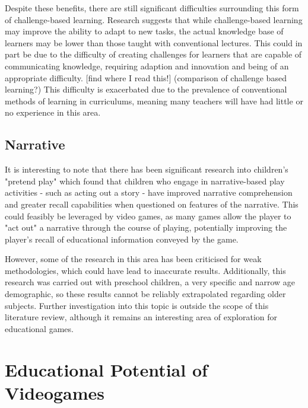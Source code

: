 \documentclass[journal]{IEEEtran}
\begin{document}
Despite these benefits, there are still significant difficulties surrounding this form of challenge-based learning. Research suggests that while challenge-based learning may improve the ability to adapt to new tasks, the actual knowledge base of learners may be lower than those taught with conventional lectures. \cite{PBLeffectsReview} This could in part be due to the difficulty of creating challenges for learners that are capable of communicating knowledge, requiring adaption and innovation and being of an appropriate difficulty. \cite{} [find where I read this!] (comparison of challenge based learning?) This difficulty is exacerbated due to the prevalence of conventional methods of learning in curriculums, meaning many teachers will have had little or no experience in this area.


\subsection{Narrative}

It is interesting to note that there has been significant research into children's "pretend play" which found that children who engage in narrative-based play activities - such as acting out a story - have improved narrative comprehension and greater recall capabilities when questioned on features of the narrative. \cite{pretendPlay} \cite{Original study} This could feasibly be leveraged by video games, as many games allow the player to "act out" a narrative through the course of playing, potentially improving the player's recall of educational information conveyed by the game.

However, some of the research in this area has been criticised for weak methodologies, which could have lead to inaccurate results. \cite{lillardPretendPlay} Additionally, this research was carried out with preschool children, a very specific and narrow age demographic, so these results cannot be reliably extrapolated regarding older subjects.  Further investigation into this topic is outside the scope of this literature review, although it remains an interesting area of exploration for educational games.


\section{Educational Potential of Videogames}
\end{document}
